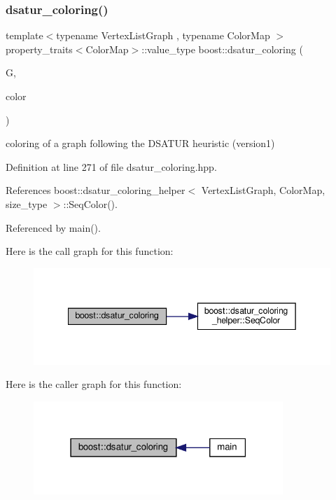 \subsubsection{\texorpdfstring{dsatur\+\_\+coloring()}{dsatur\_coloring()}}
{\footnotesize\ttfamily template$<$typename Vertex\+List\+Graph , typename Color\+Map $>$ \\
property\+\_\+traits$<$Color\+Map$>$\+::value\+\_\+type boost\+::dsatur\+\_\+coloring (\begin{DoxyParamCaption}\item[{const Vertex\+List\+Graph \&}]{G,  }\item[{Color\+Map}]{color }\end{DoxyParamCaption})}



coloring of a graph following the D\+S\+A\+T\+UR heuristic (version1) 



Definition at line 271 of file dsatur\+\_\+coloring.\+hpp.



References boost\+::dsatur\+\_\+coloring\+\_\+helper$<$ Vertex\+List\+Graph, Color\+Map, size\+\_\+type $>$\+::\+Seq\+Color().



Referenced by main().

Here is the call graph for this function\+:
\nopagebreak
\begin{figure}[H]
\begin{center}
\leavevmode
\includegraphics[width=342pt]{d4/da9/namespaceboost_af2fc5e009a055618e84aaacf8b9a0842_cgraph}
\end{center}
\end{figure}
Here is the caller graph for this function\+:
\nopagebreak
\begin{figure}[H]
\begin{center}
\leavevmode
\includegraphics[width=267pt]{d4/da9/namespaceboost_af2fc5e009a055618e84aaacf8b9a0842_icgraph}
\end{center}
\end{figure}
\mbox{\label{namespaceboost_a45bad415b0b5ee0369090a1108f6066d}} 
